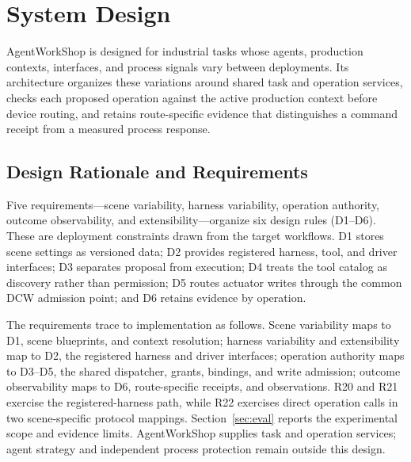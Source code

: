 \section{System Design}
\label{sec:design}
AgentWorkShop is designed for industrial tasks whose agents, production
contexts, interfaces, and process signals vary between deployments. Its
architecture organizes these variations around shared task and operation
services, checks each proposed operation against the active production
context before device routing, and retains route-specific evidence that
distinguishes a command receipt from a measured process response.

\subsection{Design Rationale and Requirements}
\label{sec:principles}
Five requirements---scene variability, harness variability, operation
authority, outcome observability, and extensibility---organize six design
rules (D1--D6). These are deployment constraints drawn from the target
workflows. D1 stores scene settings as versioned data;
D2 provides registered harness, tool, and driver interfaces; D3 separates
proposal from execution; D4 treats the tool catalog as discovery rather than
permission; D5 routes actuator writes through the common DCW admission point;
and D6 retains evidence by operation.

The requirements trace to implementation as follows.
Scene variability maps to D1, scene blueprints, and context resolution;
harness variability and extensibility map to D2, the registered harness and
driver interfaces; operation authority maps to D3--D5, the shared dispatcher,
grants, bindings, and write admission; outcome observability maps to D6,
route-specific receipts, and observations. R20 and R21 exercise the
registered-harness path, while R22 exercises direct operation calls in two
scene-specific protocol mappings. Section~\ref{sec:eval} reports the
experimental scope and evidence limits. AgentWorkShop supplies task and
operation services; agent strategy and independent process protection remain
outside this design.

